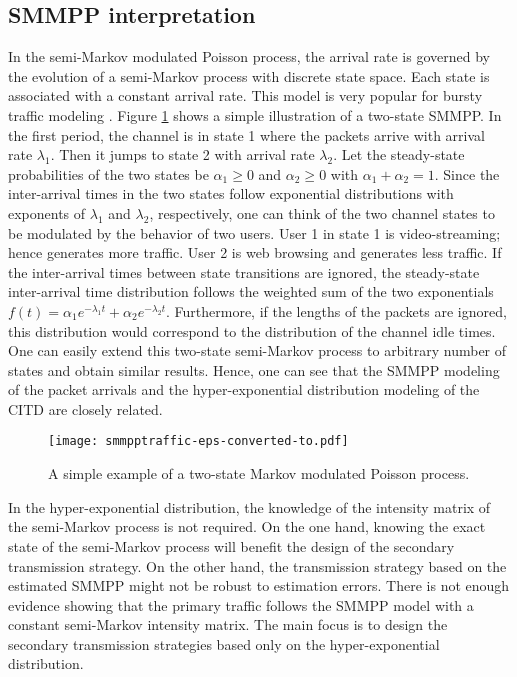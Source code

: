 \documentclass[10pt,final,journal,letterpaper]{IEEEtran}
\begin{document}
\subsection{SMMPP interpretation}\label{sec:3a}
In the semi-Markov modulated Poisson process, the arrival rate is governed by the evolution of a semi-Markov process with discrete state space. Each state is associated with a constant arrival rate. This model is very popular for bursty traffic modeling \cite{heffes1986markov, leland1994self}. Figure \ref{fig:smmpptraffic} shows a simple illustration of a two-state SMMPP. In the first period, the channel is in state 1 where the packets arrive with arrival rate $\lambda_1$. Then it jumps to state 2 with arrival rate $\lambda_2$. Let the steady-state probabilities of the two states be $\alpha_1\geq 0$ and $\alpha_2\geq 0$ with $\alpha_1+\alpha_2=1$. Since the inter-arrival times in the two states follow exponential distributions with exponents of $\lambda_1$ and $\lambda_2$, respectively, one can think of the two channel states to be modulated by the behavior of two users. User 1 in state 1 is video-streaming; hence generates more traffic. User 2 is web browsing and generates less traffic. If the inter-arrival times between state transitions are ignored, the steady-state inter-arrival time distribution follows the weighted sum of the two exponentials $f(t)=\alpha_1e^{-\lambda_1t}+\alpha_2e^{-\lambda_2t}$. Furthermore, if the lengths of the packets are ignored, this distribution would correspond to the distribution of the channel idle times. One can easily extend this two-state semi-Markov process to arbitrary number of states and obtain similar results. Hence, one can see that the SMMPP modeling of the packet arrivals and the hyper-exponential distribution modeling of the CITD are closely related.
\begin{figure}[!h]
\centering
\texttt{[image: smmpptraffic-eps-converted-to.pdf]}
\caption{A simple example of a two-state Markov modulated Poisson process.}
\label{fig:smmpptraffic}
\end{figure}

\par
In the hyper-exponential distribution, the knowledge of the intensity matrix of the semi-Markov process is not required. On the one hand, knowing the exact state of the semi-Markov process will benefit the design of the secondary transmission strategy. On the other hand, the transmission strategy based on the estimated SMMPP might not be robust to estimation errors. There is not enough evidence showing that the primary traffic follows the SMMPP model with a constant semi-Markov intensity matrix. The main focus is to design the secondary transmission strategies based only on the hyper-exponential distribution.
\end{document}
